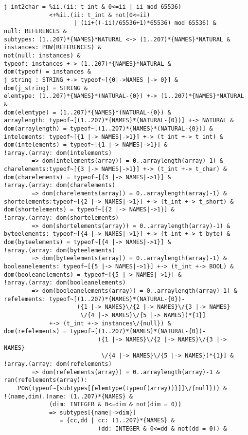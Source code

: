 \begin{verbatim}
j_int2char = %ii.(ii: t_int & 0<=ii | ii mod 65536)
             <+%ii.(ii: t_int & not(0<=ii) 
                    | (ii+((-ii)/65536+1)*65536) mod 65536) & 
null: REFERENCES & 
subtypes: (1..207)*{NAMES}*NATURAL <-> (1..207)*{NAMES}*NATURAL & 
instances: POW(REFERENCES) & 
not(null: instances) & 
typeof: instances +-> (1..207)*{NAMES}*NATURAL & 
dom(typeof) = instances & 
j_string : STRING +-> typeof~[{0|->NAMES |-> 0}] &
dom(j_string) = STRING &
elemtype: (1..207)*{NAMES}*(NATURAL-{0}) +-> (1..207)*{NAMES}*NATURAL & 
dom(elemtype) = (1..207)*{NAMES}*(NATURAL-{0}) & 
arraylength: typeof~[(1..207)*{NAMES}*(NATURAL-{0})] +-> NATURAL & 
dom(arraylength) = typeof~[(1..207)*{NAMES}*(NATURAL-{0})] & 
intelements: typeof~[{1 |-> NAMES|->1}] +-> (t_int +-> t_int) &
dom(intelements) = typeof~[{1 |-> NAMES|->1}] & 
!array.(array: dom(intelements) 
        => dom(intelements(array)) = 0..arraylength(array)-1) & 
charelements:typeof~[{3 |-> NAMES|->1}] +-> (t_int +-> t_char) &
dom(charelements) = typeof~[{3 |-> NAMES|->1}] & 
!array.(array: dom(charelements) 
        => dom(charelements(array)) = 0..arraylength(array)-1) & 
shortelements:typeof~[{2 |-> NAMES|->1}] +-> (t_int +-> t_short) &
dom(shortelements) = typeof~[{2 |-> NAMES|->1}] & 
!array.(array: dom(shortelements) 
        => dom(shortelements(array)) = 0..arraylength(array)-1) & 
byteelements: typeof~[{4 |-> NAMES|->1}] +-> (t_int +-> t_byte) &
dom(byteelements) = typeof~[{4 |-> NAMES|->1}] & 
!array.(array: dom(byteelements) 
        => dom(byteelements(array)) = 0..arraylength(array)-1) & 
booleanelements: typeof~[{5 |-> NAMES|->1}] +-> (t_int +-> BOOL) &
dom(booleanelements) = typeof~[{5 |-> NAMES|->1}] & 
!array.(array: dom(booleanelements) 
        => dom(booleanelements(array)) = 0..arraylength(array)-1) & 
refelements: typeof~[(1..207)*{NAMES}*(NATURAL-{0})-
                     ({1 |-> NAMES}\/{2 |-> NAMES}\/{3 |-> NAMES}
                      \/{4 |-> NAMES}\/{5 |-> NAMES})*{1}] 
             +-> (t_int +-> instances\/{null}) &
dom(refelements) = typeof~[(1..207)*{NAMES}*(NATURAL-{0})-
                           ({1 |-> NAMES}\/{2 |-> NAMES}\/{3 |-> NAMES}
                            \/{4 |-> NAMES}\/{5 |-> NAMES})*{1}] & 
!array.(array: dom(refelements) 
        => dom(refelements(array)) = 0..arraylength(array)-1 & 
ran(refelements(array)): 
    POW(typeof~[subtypes[{elemtype(typeof(array))}]]\/{null})) & 
!(name,dim).(name: (1..207)*{NAMES} & 
             (dim: INTEGER & 0<=dim & not(dim = 0)) 
             => subtypes[{name|->dim}] 
                = {cc,dd | cc: (1..207)*{NAMES} & 
                           (dd: INTEGER & 0<=dd & not(dd = 0)) & 

\end{verbatim}
